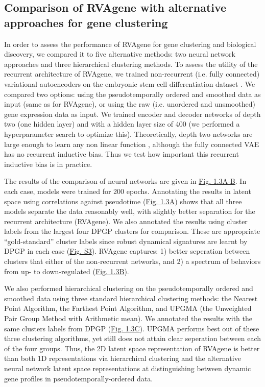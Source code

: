 \subsection{Comparison of RVAgene with alternative approaches for gene clustering}

In order to assess the performance of RVAgene for gene clustering and biological discovery, we compared it to five alternative methods: two neural network approaches and three hierarchical clustering methods. To assess the utility of the recurrent architecture of RVAgene, we trained non-recurrent (i.e. fully connected) variational autoencoders on the embryonic stem cell differentiation dataset \citep{Klein2015}. We compared two options: using the pseudotemporally ordered and smoothed data as input (same as for RVAgene), or using the raw (i.e. unordered and unsmoothed) gene expression data as input. We trained encoder and decoder networks of depth two (one hidden layer) and with a hidden layer size of 400 (we performed a hyperparameter search to optimize this). Theoretically, depth two networks are large enough to learn any non linear function \citep{cybenko1989approximation, hornik1989multilayer, funahashi1989approximate, barron1994approximation}, although the fully connected VAE has no recurrent inductive bias. Thus we test how important this recurrent inductive bias is in practice. 
\par 
The results of the comparison of neural networks are given in \hyperref[fig:fig4]{Fig. 1.3A-B}. In
each case, models were trained for 200 epochs. Annotating the results in latent space using
correlations against pseudotime (\hyperref[fig:fig4]{Fig. 1.3A}) shows that all three models
separate the data reasonably well, with slightly better separation for the recurrent architecture
(RVAgene). We also annotated the results using cluster labels from the largest four DPGP clusters
for comparison. These are appropriate ``gold-standard'' cluster labels since robust dynamical
signatures are learnt by DPGP in each case (\hyperref[supp]{Fig. S3}). RVAgene captures: 1) better
seperation between clusters that either of the non-recurrent networks, and 2) a spectrum of
behaviors from up- to down-regulated (\hyperref[fig:fig4]{Fig. 1.3B}).
\par 
We also performed hierarchical clustering on the pseudotemporally ordered and smoothed data using
three standard hierarchical clustering methods: the Nearest Point Algorithm, the Farthest Point
Algorithm, and UPGMA (the Unweighted Pair Group Method with Arithmetic mean). We annotated the
results with the same clusters labels from DPGP (\hyperref[fig:fig4]{Fig. 1.3C}). UPGMA performs best out of these three clustering algorithms, yet still does not attain clear seperation between each of the four groups. Thus, the 2D latent space representation of RVAgene is better than both 1D representations via hierarchical clustering and the alternative neural network latent space representations at distinguishing between dynamic gene profiles in pseudotemporally-ordered data.



